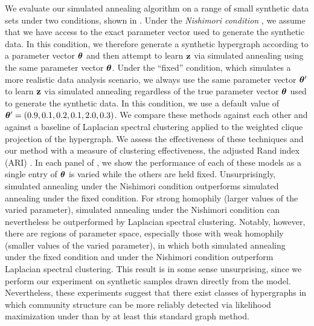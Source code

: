 \documentclass[aps,pre,reprint,superscriptaddress,nofootinbib]{revtex4-2}
\begin{document}
We evaluate our simulated annealing algorithm on a range of small synthetic data sets under two conditions, shown in . 
Under the \emph{Nishimori condition} \cite{decelle2011asymptotic}, we assume that we have access to the exact parameter vector used to generate the synthetic data. 
In this condition, we therefore generate a synthetic hypergraph according to a parameter vector $\boldsymbol{\theta}$ and then attempt to learn $\mathbf{z}$ via simulated annealing using the same parameter vector $\boldsymbol{\theta}$. 
Under the ``fixed'' condition, which simulates a more realistic data analysis scenario, we always use the same parameter vector $\boldsymbol{\theta}'$ to learn $\mathbf{z}$ via simulated annealing regardless of the true parameter vector $\boldsymbol{\theta}$ used to generate the synthetic data. 
In this condition, we use a default value of $\boldsymbol{\theta}' = (0.9, 0.1, 0.2, 0.1, 2.0, 0.3)$. 
We compare these methods against each other and against a baseline of Laplacian spectral clustering \cite{luxburg2007tutorial} applied to the weighted clique projection of the hypergraph. 
We assess the effectiveness of these techniques and our method with a measure of clustering effectiveness, the adjusted Rand index (ARI) \cite{hubert1985comparing}.
In each panel of , we show the performance of each of these models as a single entry of $\boldsymbol{\theta}$ is varied while the others are held fixed. 
Unsurprisingly, simulated annealing under the Nishimori condition outperforms simulated annealing under the fixed condition. 
For strong homophily (larger values of the varied parameter), simulated annealing under the Nishimori condition can nevertheless be outperformed by Laplacian spectral clustering. 
Notably, however, there are regions of parameter space, especially those with weak homophily (smaller values of the varied parameter), in which both simulated annealing under the fixed condition and under the Nishimori condition outperform Laplacian spectral clustering. 
This result is in some sense unsurprising, since we perform our experiment on synthetic samples drawn directly from the \model{} model.
Nevertheless, these experiments suggest that there exist classes of hypergraphs in which community structure can be more reliably detected via likelihood maximization under \model{} than by at least this standard graph method. 
\end{document}
